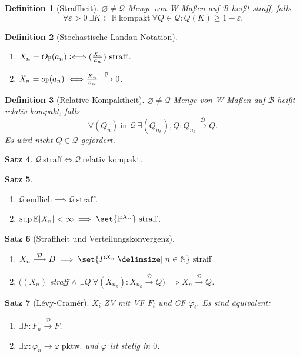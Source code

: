 \documentclass[a4paper,8pt]{article}
\newcounter{Sec}
\theoremstyle{nonumberbreak}
\newtheorem{definition}{Definition}[Sec]
\newtheorem{satz}[definition]{Satz}
\newcommand{\defiff}{\mathrel{\vcentcolon\Longleftrightarrow}}
\renewcommand{\P}{\mathbb{P}}
\newcommand{\R}{\mathbb{R}}
\newcommand{\E}{\mathbb{E}}
\newcommand{\N}{\mathbb{N}}
\newcommand{\cf}{\varphi}
\newcommand{\sk}{\mathrel{\stackrel{\P}{\longrightarrow}}}
\newcommand{\vk}{\mathrel{\stackrel{\mathcal{D}}{\longrightarrow}}}
\begin{document}
\begin{multicols}{3}
\begin{definition}[Straffheit]
		$\varnothing\neq\mathcal{Q}$ Menge von W-Maßen auf $\mathcal{B}$ heißt straff, falls
		\[\forall\varepsilon>0~\exists K\subset\R~\text{kompakt}~\forall Q\in\mathcal{Q}:Q(K)\geq 1-\varepsilon.\]
	\end{definition}
	\begin{definition}[Stochastische Landau-Notation]
		\begin{enumerate}[label=(\alph*)]
			\item $X_n = O_\P(a_n) \defiff (\frac{X_n}{a_n})~\text{straff}$.
			\item $X_n = o_\P(a_n) \defiff \frac{X_n}{a_n}\sk 0$.
		\end{enumerate}
	\end{definition}
	\begin{definition}[Relative Kompaktheit]
		$\varnothing\neq\mathcal{Q}$ Menge von W-Maßen auf $\mathcal{B}$ heißt relativ kompakt, falls
		\[\forall (Q_n)~\text{in $\mathcal{Q}$}~\exists (Q_{n_k}), Q: Q_{n_k}\vk Q.\]
		Es wird \textit{nicht} $Q\in\mathcal{Q}$ gefordert.
	\end{definition}
	\begin{satz}
		$\mathcal{Q}~\text{straff}\iff\mathcal{Q}~\text{relativ kompakt}$.
	\end{satz}
	\begin{satz}
		\begin{enumerate}[label=(\alph*)]
			\item $\mathcal{Q}~\text{endlich}\implies\mathcal{Q}~\text{straff}$.
			\item $\sup\E\abs{X_n}<\infty\implies\set{\P^{X_n}}~\text{straff}$.
		\end{enumerate}
	\end{satz}
	\begin{satz}[Straffheit und Verteilungskonvergenz]
		\begin{enumerate}[label=(\alph*)]
			\item $X_n\vk D\implies\set{P^{X_n}\given n\in\N}~\text{straff}$.
			\item $((X_n)$ straff $\land$ $\exists Q~\forall (X_{n_k}): X_{n_k}\vk Q)\implies X_n\vk Q$.
		\end{enumerate}
	\end{satz}
	\begin{satz}[Lévy-Cramér]
		$X_i$ ZV mit VF $F_i$ und CF $\cf_i$. Es sind äquivalent:
		\begin{enumerate}[label=(\alph*)]
			\item $\exists F: F_n\vk F$.
			\item $\exists \cf: \cf_n\to\cf~\text{pktw.}$ und $\cf$ ist stetig in $0$.

\end{enumerate}
\end{satz}
\end{multicols}
\end{document}
